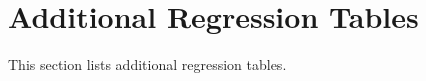 \documentclass[\econtexRoot/ProjectABM]{subfiles}
\begin{document}

\section{Additional Regression Tables}\label{sec:ApndxRegTables}
This section lists additional regression tables.












%



\end{document}

